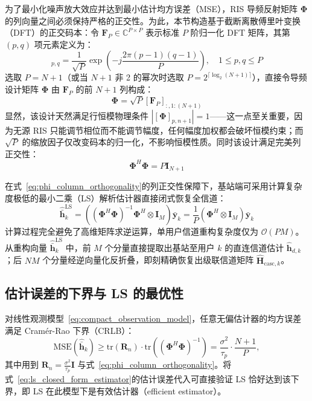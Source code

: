 为了最小化噪声放大效应并达到最小估计均方误差（MSE），RIS 导频反射矩阵 $\bm{\Phi}$ 的列向量之间必须保持严格的正交性。为此，本节构造基于截断离散傅里叶变换（DFT）的正交码本：令 $\bm{F}_{P} \in \mathbb{C}^{P \times P}$ 表示标准 $P$ 阶归一化 DFT 矩阵，其第 $(p, q)$ 项元素定义为：
\begin{equation}
  [\bm{F}_P]_{p, q} = \frac{1}{\sqrt{P}} \exp\left( -j \frac{2\pi (p-1)(q-1)}{P} \right), \quad 1 \le p, q \le P
  \label{eq:dft_matrix_element}
\end{equation}
选取 $P = N+1$（或当 $N+1$ 非 2 的幂次时选取 $P = 2^{\lceil \log_2(N+1) \rceil}$），直接令导频设计矩阵 $\bm{\Phi}$ 由 $\bm{F}_P$ 的前 $N+1$ 列构成：
\begin{equation}
  \bm{\Phi} = \sqrt{P} [\bm{F}_P]_{:, 1:(N+1)}
  \label{eq:optimal_dft_codebook}
\end{equation}
显然，该设计天然满足行恒模物理条件 $|[\bm{\Phi}]_{p, n+1}| = 1$——这一点至关重要，因为无源 RIS 只能调节相位而不能调节幅度，任何幅度加权都会破坏恒模约束；而 $\sqrt{P}$ 的缩放因子仅改变码本的归一化，不影响恒模性质。同时该设计满足完美列正交性：
\begin{equation}
  \bm{\Phi}^H \bm{\Phi} = P \bm{I}_{N+1}
  \label{eq:phi_column_orthogonality}
\end{equation}

在式~\eqref{eq:phi_column_orthogonality}的列正交性保障下，基站端可采用计算复杂度极低的最小二乘（LS）解析估计器直接闭式恢复全信道：
\begin{equation}
  \hat{\bar{\bm{h}}}_k^{\mathrm{LS}} = \left( (\bm{\Phi}^H \bm{\Phi})^{-1}\bm{\Phi}^H \otimes \bm{I}_M \right) \bar{\bm{y}}_k = \frac{1}{P} \left( \bm{\Phi}^H \otimes \bm{I}_M \right) \bar{\bm{y}}_k
  \label{eq:ls_closed_form_estimator}
\end{equation}
计算过程完全避免了高维矩阵求逆运算，单用户信道重构复杂度仅为 $\mathcal{O}(PM)$。从重构向量 $\hat{\bar{\bm{h}}}_k^{\mathrm{LS}}$ 中，前 $M$ 个分量直接提取出基站至用户 $k$ 的直连信道估计 $\hat{\bm{h}}_{d,k}$；后 $NM$ 个分量经逆向量化反折叠，即刻精确恢复出级联信道矩阵 $\hat{\bm{H}}_{\mathrm{casc},k}$。

\subsection{估计误差的下界与 LS 的最优性}
\label{sec:ls_analysis}

对线性观测模型~\eqref{eq:compact_observation_model}，任意无偏估计器的均方误差满足 Cramér-Rao 下界（CRLB）：
\begin{equation}
  \mathrm{MSE}\left(\hat{\bar{\bm{h}}}_k\right) \ge \mathrm{tr}\left( \bm{R}_n \right)\cdot\mathrm{tr}\left( \left(\bm{\Phi}^H\bm{\Phi}\right)^{-1} \right)
  = \frac{\sigma^2}{\tau_p}\cdot\frac{N+1}{P},
  \label{eq:crlb_ce}
\end{equation}
其中用到 $\bm{R}_n = \frac{\sigma^2}{\tau_p}\bm{I}$ 与式~\eqref{eq:phi_column_orthogonality}。将式~\eqref{eq:ls_closed_form_estimator}的估计误差代入可直接验证 LS 恰好达到该下界，即 LS 在此模型下是有效估计器（efficient estimator）。

